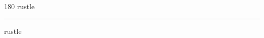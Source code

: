 
\begin{frame}
\begin{center}
\begin{turn}{180}
{\fontsize{2.5cm}{1em}\selectfont rustle}
\end{turn}
\vspace{1em}\par  
\hrule
\vspace{1em}\par  
{\fontsize{2.5cm}{1em}\selectfont rustle}
\end{center}
\end{frame}
